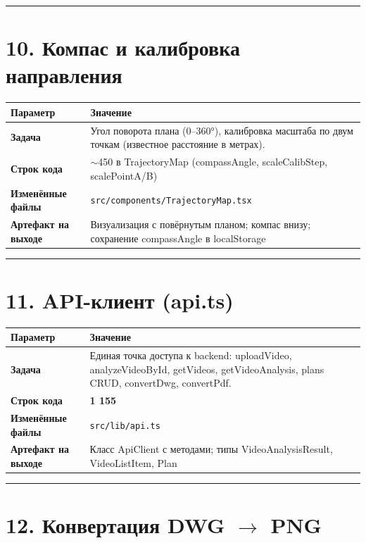 \documentclass[12pt,a4paper]{article}
\begin{document}
\vspace{1em}
\hrule
\vspace{1em}

\section{10. Компас и калибровка направления}

\begin{tabular}{>{\bfseries}l p{10cm}}
\toprule
Параметр & Значение \\
\midrule
Задача & Угол поворота плана (0--360°), калибровка масштаба по двум точкам (известное расстояние в метрах). \\
Строк кода & $\sim$450 в TrajectoryMap (compassAngle, scaleCalibStep, scalePointA/B) \\
Изменённые файлы & \texttt{src/components/TrajectoryMap.tsx} \\
Артефакт на выходе & Визуализация с повёрнутым планом; компас внизу; сохранение compassAngle в localStorage \\
\bottomrule
\end{tabular}

\vspace{1em}
\hrule
\vspace{1em}

\section{11. API-клиент (api.ts)}

\begin{tabular}{>{\bfseries}l p{10cm}}
\toprule
Параметр & Значение \\
\midrule
Задача & Единая точка доступа к backend: uploadVideo, analyzeVideoById, getVideos, getVideoAnalysis, plans CRUD, convertDwg, convertPdf. \\
Строк кода & \textbf{1 155} \\
Изменённые файлы & \texttt{src/lib/api.ts} \\
Артефакт на выходе & Класс ApiClient с методами; типы VideoAnalysisResult, VideoListItem, Plan \\
\bottomrule
\end{tabular}

\vspace{1em}
\hrule
\vspace{1em}

\section{12. Конвертация DWG $\rightarrow$ PNG}
\end{document}
